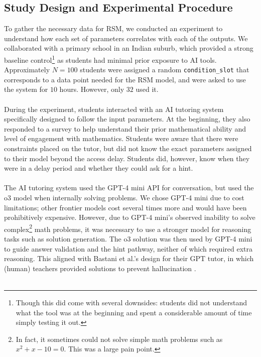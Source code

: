 \documentclass[12pt]{article}
\begin{document}
\subsection{Study Design and Experimental Procedure}

To gather the necessary data for RSM, we conducted an experiment to understand how each set of parameters correlates with each of the outputs. We collaborated with a primary school in an Indian suburb, which provided a strong baseline control\footnote{Though this did come with several downsides: students did not understand what the tool was at the beginning and spent a considerable amount of time simply testing it out.} as students had minimal prior exposure to AI tools. Approximately $N=100$ students were assigned a random \texttt{condition\_slot} that corresponds to a data point needed for the RSM model, and were asked to use the system for $10$ hours. However, only $32$ used it.
\\\\
During the experiment, students interacted with an AI tutoring system specifically designed to follow the input parameters. At the beginning, they also responded to a survey to help understand their prior mathematical ability and level of engagement with mathematics. Students were aware that there were constraints placed on the tutor, but did not know the exact parameters assigned to their model beyond the access delay. Students did, however, know when they were in a delay period and whether they could ask for a hint.
\\\\
The AI tutoring system used the GPT-4 mini API for conversation, but used the o3 model when internally solving problems. We chose GPT-4 mini due to cost limitations; other frontier models cost several times more and would have been prohibitively expensive. However, due to GPT-4 mini's observed inability to solve complex\footnote{In fact, it sometimes could not solve simple math problems such as $x^2+x-10=0$. This was a large pain point.} math problems, it was necessary to use a stronger model for reasoning tasks such as solution generation. The o3 solution was then used by GPT-4 mini to guide answer validation and the hint pathway, neither of which required extra reasoning. This aligned with Bastani et al.'s design for their GPT tutor, in which (human) teachers provided solutions to prevent hallucination \cite{bastaniharm}.
\\\\
\end{document}
